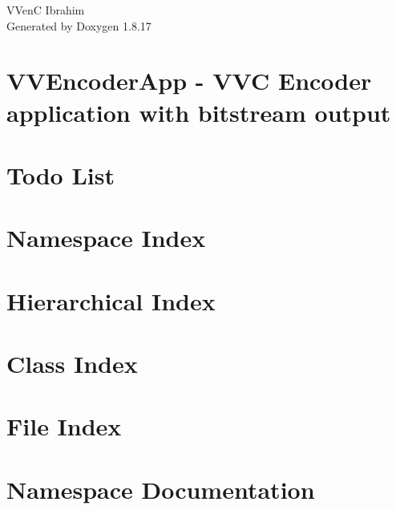 \let\mypdfximage\pdfximage\def\pdfximage{\immediate\mypdfximage}\documentclass[twoside]{book}
\newcommand{\+}{\discretionary{\mbox{\scriptsize$\hookleftarrow$}}{}{}}
\newcommand{\clearemptydoublepage}{%
  \newpage{\pagestyle{empty}\cleardoublepage}%
}
\begin{document}
\hypersetup{pageanchor=false,
             bookmarksnumbered=true,
             pdfencoding=unicode
            }
\begin{titlepage}
\vspace*{7cm}
\begin{center}%
{\Large V\+VenC Ibrahim }\\
\vspace*{1cm}
{\large Generated by Doxygen 1.8.17}\\
\end{center}
\end{titlepage}
\clearemptydoublepage
{}
\tableofcontents
\clearemptydoublepage
{}
\hypersetup{pageanchor=true}

\chapter{V\+V\+Encoder\+App -\/ V\+VC Encoder application with bitstream output}
\label{md__home_itaabane_Bureau_vvencp_vvenc-master_source_App_vvencapp_readme}

\chapter{Todo List}
\label{todo}

\chapter{Namespace Index}

\chapter{Hierarchical Index}

\chapter{Class Index}

\chapter{File Index}

\chapter{Namespace Documentation}













\end{document}
